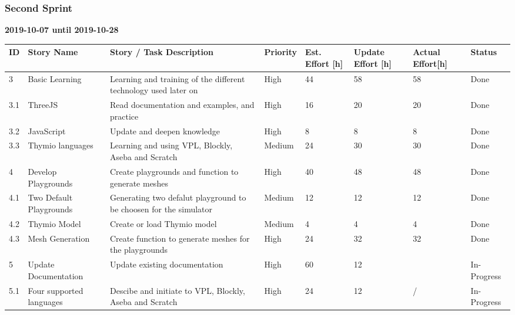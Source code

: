 \documentclass{scrartcl}
\begin{document}
\subsubsection{Second Sprint}
\textbf{2019-10-07 until 2019-10-28}
\begin{longtable}{p{5mm}|p{2cm}|p{4cm}|p{1cm}|p{1cm}|p{1cm}|p{1cm}|p{15mm}}
  ID                     & Story Name & Story / Task Description & Priority & Est. Effort {[}h{]} & Update Effort {[}h{]} & Actual Effort{[}h{]} & Status                \\ \hline
  3 & Basic Learning & Learning and training of the different technology used later on & High & 44 & 58 & 58 & Done \\
  3.1 & ThreeJS & Read documentation and examples, and practice & High & 16 & 20 & 20 & Done \\ 
  3.2 & JavaScript & Update and deepen knowledge  & High & 8 & 8 & 8 & Done \\ 
  3.3 & Thymio languages & Learning and using VPL, Blockly, Aseba and Scratch & Medium & 24 & 30 & 30 & Done \\ 
  4 & Develop Playgrounds & Create playgrounds and function to generate meshes & High & 40 & 48 & 48 & Done \\ 
  4.1 & Two Default Playgrounds & Generating two defalut playground to be choosen for the simulator & Medium & 12 & 12 & 12 & Done \\ 
  4.2 & Thymio Model & Create or load Thymio model & Medium & 4 & 4 & 4 & Done \\ 
  4.3 & Mesh Generation & Create function to generate meshes for the playgrounds & High & 24 & 32 & 32 & Done \\ 
  5 & Update Documentation & Update existing documentation & High & 60 & 12 &  & In-Progress \\
  5.1 & Four supported languages & Descibe and initiate to VPL, Blockly, Aseba and Scratch & High & 24 & 12 & {/} & In-Progress \\ 
\end{longtable}
\end{document}
